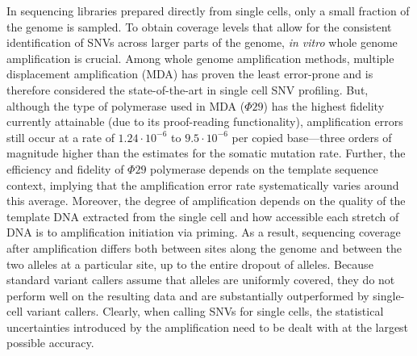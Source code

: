 \documentclass[12pt,inline]{wlscirep}
\begin{document}
In sequencing libraries prepared directly from single cells, only a small fraction of the genome is sampled.
To obtain coverage levels that allow for the consistent identification of SNVs across larger parts of the genome, \textit{in vitro} whole genome amplification is crucial. 
Among whole genome amplification methods, multiple displacement amplification (MDA\cite{dean_comprehensive_2002}) has proven the least error-prone and is therefore considered the state-of-the-art in single cell SNV profiling\cite{de_bourcy_quantitative_2014,hou_comparison_2015,huang_single-cell_2015,estevez-gomez_comparison_2018}.
But, although the type of polymerase used in MDA ($\Phi29$) has the highest fidelity currently attainable (due to its proof-reading functionality), amplification errors still occur at a rate of $1.24 \cdot 10^{-6}$ to $9.5 \cdot 10^{-6}$ per copied base\cite{paez_genome_2004,wang_genome-wide_2012,wang_clonal_2014,de_bourcy_quantitative_2014,lodato_somatic_2015}---three orders of magnitude higher than the estimates for the somatic mutation rate.
Further, the efficiency and fidelity of $\Phi29$ polymerase depends on the template sequence context\cite{de_paz_high-resolution_2018}, implying that the amplification error rate systematically varies around this average.
Moreover, the degree of amplification depends on the quality of the template DNA extracted from the single cell\cite{baumer_exploring_2018} and how accessible each stretch of DNA is to amplification initiation via priming\cite{picher_trueprime_2016}.
As a result, sequencing coverage after amplification differs both between sites along the genome and between the two alleles at a particular site, up to the entire dropout of alleles\cite{spits_optimization_2006}.
Because standard variant callers assume that alleles are uniformly covered, they do not perform well on the resulting data and are substantially outperformed by  single-cell  variant callers\cite{zafar_monovar:_2016,dong_accurate_2017}.
Clearly, when calling SNVs for single cells, the statistical uncertainties introduced by the amplification need to be dealt with at the largest possible accuracy.
\end{document}
